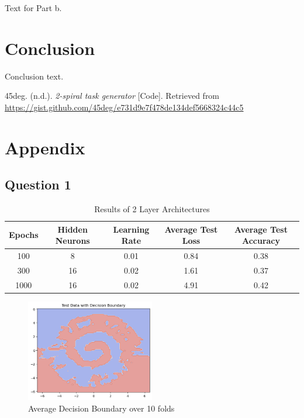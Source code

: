 \documentclass[runningheads]{llncs}
\begin{document}
Text for Part b.

\section{Conclusion}

Conclusion text.

\pagebreak

\begin{thebibliography}{}
 45deg. (n.d.). \textit{2-spiral task generator} [Code]. Retrieved from \url{https://gist.github.com/45deg/e731d9e7f478de134def5668324c44c5}
\end{thebibliography}


\appendix
\section{Appendix}

\subsection{Question 1}

\begin{table}[ht]
  \centering
  \caption{Results of 2 Layer Architectures}
  \begin{tabular}{c c c c c}
    \toprule
    Epochs \quad & Hidden Neurons \quad & Learning Rate \quad & Average Test Loss \quad & Average Test Accuracy \\
    \midrule
    100 & 8  & 0.01 & 0.84 & 0.38 \\
    300 & 16  & 0.02 & 1.61 & 0.37 \\
    1000 & 16  & 0.02 & 4.91 & 0.42 \\
    \bottomrule
  \end{tabular}
  \label{tab:1A2LayerResults}
\end{table}

\begin{figure}[!htb]
  \centering
  \includegraphics[width=0.5\textwidth]{Question1Images/firstFFNNOutput.png}
  \caption{Average Decision Boundary over 10 folds}
  \label{fig:FirstFFNNDecision}
\end{figure}
\end{document}
